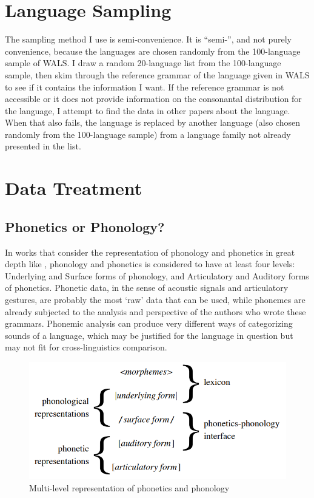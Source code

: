 \section{Language Sampling}

The sampling method I use is semi-convenience. It is ``semi-'', and not purely convenience, because the languages are chosen randomly from the 100-language sample of WALS. 
I draw a random 20-language list from the 100-language sample, then skim through the reference grammar of the language given in WALS to see if it contains the information I want. 
If the reference grammar is not accessible or it does not provide information on the consonantal distribution for the language, I attempt to find the data in other papers about the language. 
When that also fails, the language is replaced by another language (also chosen randomly from the 100-language sample) from a language family not already presented in the list.

\section{Data Treatment}

\subsection{Phonetics or Phonology?}

In works that consider the representation of phonology and phonetics in great depth like \citet{Boersma1998, Boersma2007}, phonology and phonetics is considered to have at least four levels: Underlying and Surface forms of phonology, and Articulatory and Auditory forms of phonetics.
Phonetic data, in the sense of acoustic signals and articulatory gestures, are probably the most `raw' data that can be used, while phonemes are already subjected to the analysis and perspective of the authors who wrote these grammars. 
Phonemic analysis can produce very different ways of categorizing sounds of a language, which may be justified for the language in question but may not fit for cross-linguistics comparison. 

\begin{figure}[h]
    \centering
    \includegraphics[width=0.75\linewidth]{figures/representation.png}
    \caption{Multi-level representation of phonetics and phonology \citep{Boersma2009}}
    \label{fig:representation}
\end{figure}

